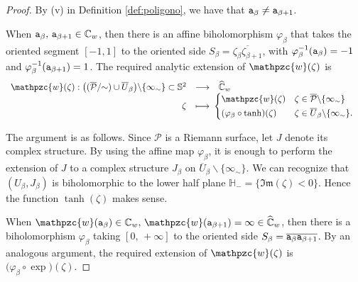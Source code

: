 \documentclass[final,3p,times]{elsarticle}
\newcommand{\CC}{\ensuremath{{\mathbb C}}}
\newcommand{\CW}{\ensuremath{{\widehat{\mathbb C}}}}
\newcommand{\HH}{\ensuremath{{\mathbb H}}}
\newcommand{\esf}{\ensuremath{{\mathbb S}^2}}
\renewcommand{\Im}[1]{{\mathfrak{Im}\left(#1\right)}}
\theoremstyle{definition}
\begin{document}
\begin{proof}
By (v) in Definition \ref{def:poligono}, we have that 
${\tt a}_\beta \neq  {\tt a}_{\beta+1}$. 

\noindent 
When ${\tt a}_\beta, \, {\tt a}_{\beta+1} \in \CC_w$, 
then there is an affine biholomorphism $\varphi_\beta$
that takes the oriented segment $[-1,1]$ to 
the oriented side 
$S_\beta = \overline{\zeta_\beta \zeta_{\beta+1}}$, 
with
$\varphi_\beta^{-1}({\tt a}_\beta) = -1$ and  
$\varphi_\beta^{-1}({\tt a}_{\beta+1}) = 1$.
The required analytic extension of $\mathpzc{w}(\zeta)$ is
\begin{equation*}
\label{eq:extension-a-un-hueco-de-disco}
\begin{array}{rcl}
\mathpzc{w}(\zeta): 
\big( (\overline{\mathcal{P}} /\hspace{-.1cm}\sim ) \cup 
\overline{U}_\beta 
\big)
\backslash \{ \infty_\sim \} 
\subset \esf 
& \longrightarrow   &  \CW_w
\\
\zeta & \longmapsto &
\hspace{-5pt}
\left\{
\hspace{-5pt}
\begin{array}{ll}
\mathpzc{w}(\zeta) &  \zeta \in \overline{\mathcal{P}} \backslash \{ \infty_\sim \}
\\
& \vspace{-.3cm}
\\
(\varphi_\beta \circ \tanh)(\zeta)
& 
\zeta \in 
\overline{U}_\beta 
\backslash \{ \infty_\sim \}.
\end{array}
\right. 
\end{array}
\end{equation*}

\noindent 
The argument is as follows. 
Since $\mathcal{P}$ is a Riemann surface, let $J$
denote its complex structure. 
By using  the affine map $\varphi_\beta$, 
it is enough to perform the extension of 
$J$ to a complex structure $J_\beta$ on 
$ \overline{U}_\beta 
\backslash \{ \infty_\sim \}$. 
We can recognize that $( U_\beta, J_\beta)$ is 
biholomorphic to the lower half plane 
$\HH_- = \{ \Im{\zeta} < 0\}$. 
Hence the function $\tanh(\zeta)$ makes sense.



When $\mathpzc{w}({\tt a}_\beta) \in \CC_w, \, \mathpzc{w}({\tt a}_{\beta+1})=\infty \in \CW_w$, 
then there is a biholomorphism $\varphi_\beta$
taking $[0,\, +\infty ]$ to 
the oriented side 
$S_\beta = \overline{{\tt a}_\beta {\tt a}_{\beta+1}}$.
By an analogous argument, 
the required extension of 
$\mathpzc{w}(\zeta)$ 
is $\big(\varphi_\beta \circ \exp\big)(\zeta)$. 
\end{proof}
\end{document}
